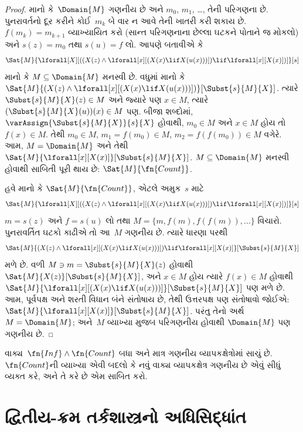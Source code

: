 \begin{proof}
માનો કે~$\Domain{M}$ ગણનીય છે અને $m_0$, $m_1$, \dots,
તેની પરિગણના છે. પુનરાવર્તનો દૂર કરીને કોઈ~$m_k$ બે વાર ન આવે તેની
ખાતરી કરી શકાય છે. $f(m_k) = m_{k+1}$ વ્યાખ્યાયિત કરો (સાન્ત
પરિગણનાના છેલ્લા ઘટકને પોતાને જ મોકલો) અને $s(z) = m_0$ તથા
$s(u) = f$ લો. આપણે બતાવીએ કે
\[
\Sat{M}{\lforall[X][((X(z) \land \lforall[x][(X(x) \lif X(u(x)))])
    \lif \lforall[x][X(x)])]}[s]
\]
માનો કે $M \subseteq \Domain{M}$ મનસ્વી છે. વધુમાં માનો કે
$\Sat{M}{(X(z) \land \lforall[x][(X(x) \lif
X(u(x)))])}[\Subst{s}{M}{X}]$. ત્યારે
$\Subst{s}{M}{X}(z) \in M$ અને જ્યારે પણ $x \in M$, ત્યારે
$(\Subst{s}{M}{X}(u))(x) \in M$ પણ. બીજા શબ્દોમાં,
$\varAssign{\Subst{s}{M}{X}}{s}{X}$ હોવાથી, $m_0 \in M$ અને
$x \in M$ હોય તો $f(x) \in M$. તેથી $m_0 \in M$,
$m_1 = f(m_0) \in M$, $m_2 = f(f(m_0)) \in M$ વગેરે. આમ,
$M = \Domain{M}$ અને તેથી
$\Sat{M}{\lforall[x][X(x)]}[\Subst{s}{M}{X}]$. $M \subseteq
\Domain{M}$ મનસ્વી હોવાથી સાબિતી પૂરી થાય છે:
$\Sat{M}{\fn{Count}}$.

હવે માનો કે $\Sat{M}{\fn{Count}}$, એટલે અમુક~$s$ માટે
\[
\Sat{M}{\lforall[X][((X(z) \land \lforall[x][(X(x) \lif X(u(x)))])
    \lif \lforall[x][X(x)])]}[s]
\]
$m = s(z)$ અને $f = s(u)$ લો તથા
$M = \{m,
f(m), f(f(m)), \dots\}$ વિચારો. પુનરાવર્તિત ઘટકો કાઢીએ તો
આ~$M$ ગણનીય છે. ત્યારે ધારણા પરથી
\[
\Sat{M}{(X(z) \land \lforall[x][(X(x) \lif X(u(x)))] )
    \lif \lforall[x][X(x)]}[\Subst{s}{M}{X}]
\]
મળે છે. વળી $M \ni m =
\Subst{s}{M}{X}(z)$ હોવાથી $\Sat{M}{X(z)}[\Subst{s}{M}{X}]$,
અને $x \in M$ હોય ત્યારે $f(x) \in
M$ હોવાથી $\Sat{M}{\lforall[x][(X(x) \lif
X(u(x)))]}[\Subst{s}{M}{X}]$ પણ મળે છે. આમ, પૂર્વપક્ષ અને
શરતી વિધાન બંને સંતોષાય છે, તેથી ઉત્તરપક્ષ પણ સંતોષાવો જોઈએ:
$\Sat{M}{\lforall[x][X(x)]}[\Subst{s}{M}{X}]$. પરંતુ તેનો અર્થ
$M = \Domain{M}$; અને~$M$ વ્યાખ્યા મુજબ પરિગણનીય હોવાથી
$\Domain{M}$ પણ ગણનીય છે.
\end{proof}

\begin{prob}
વાક્ય~$\fn{Inf} \land \fn{Count}$ બધા અને માત્ર
ગણનીય વ્યાપકક્ષેત્રોમાં સાચું છે. $\fn{Count}$ની વ્યાખ્યા
એવી બદલો કે નવું વાક્ય વ્યાપકક્ષેત્ર ગણનીય છે એવું
સીધું વ્યક્ત કરે, અને તે કરે છે એમ સાબિત કરો.
\end{prob}





\section{દ્વિતીય-ક્રમ તર્કશાસ્ત્રનો અધિસિદ્ધાંત}
















